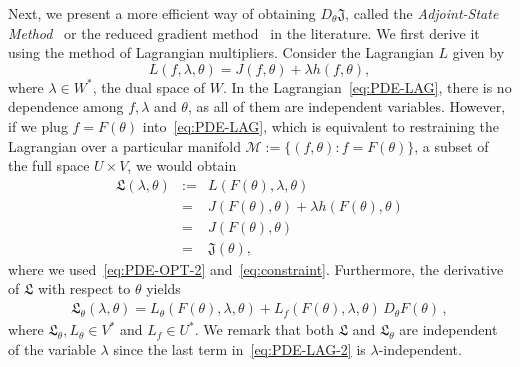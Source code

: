 \documentclass[12pt]{amsart}
\begin{document}
Next, we present a more efficient way of obtaining $D_\theta \mathfrak{J}$, called the \textit{Adjoint-State Method}~\cite{hinze2008optimization,borzi2011computational} or the reduced gradient method~\cite{herzog2010algorithms} in the literature. We first derive it using the method of Lagrangian multipliers. Consider the Lagrangian $L$ given by
\begin{equation}\label{eq:PDE-LAG}
    L(f,\lambda,\theta) = J(f,\theta) +  \lambda  h(f,\theta) ,
\end{equation}
where $\lambda \in W^*$, the dual space of $W$. In the Lagrangian~\eqref{eq:PDE-LAG}, there is no dependence among $f,\lambda$ and $\theta$, as all of them are independent variables. 
However, if we plug $f = F(\theta)$ into~\eqref{eq:PDE-LAG}, which is equivalent to restraining the Lagrangian over a particular manifold $\mathcal{M} := \{(f,\theta): f = F(\theta)\}$, a subset of the full space $U \times V$, 
we would obtain
\begin{eqnarray}
\mathfrak{L}(\lambda,\theta)&:=&L(F(\theta),\lambda,\theta) \nonumber \\
&=& J(F(\theta),\theta) + \lambda  h(F(\theta),\theta) \nonumber \\
&=&  J(F(\theta),\theta) \nonumber \\
&=& \mathfrak{J}(\theta), \label{eq:PDE-LAG-2}
\end{eqnarray}
where we used~\eqref{eq:PDE-OPT-2} and~\eqref{eq:constraint}. Furthermore, the derivative of $\mathfrak{L}$ with respect to $\theta$ yields
\begin{eqnarray}\label{eq:PDE-LAG-3}
     \mathfrak{L}_\theta( \lambda,\theta)   = L_\theta (F(\theta), \lambda,\theta) + L_f(F(\theta), \lambda,\theta) \, D_\theta F(\theta)\,,
\end{eqnarray}
where $\mathfrak{L}_\theta, L_\theta \in V^*$ and $L_f \in U^*$. We remark that both $\mathfrak{L}$ and $ \mathfrak{L}_\theta$ are independent of the variable $\lambda$ since the last term in~\eqref{eq:PDE-LAG-2} is $\lambda$-independent.
\end{document}
